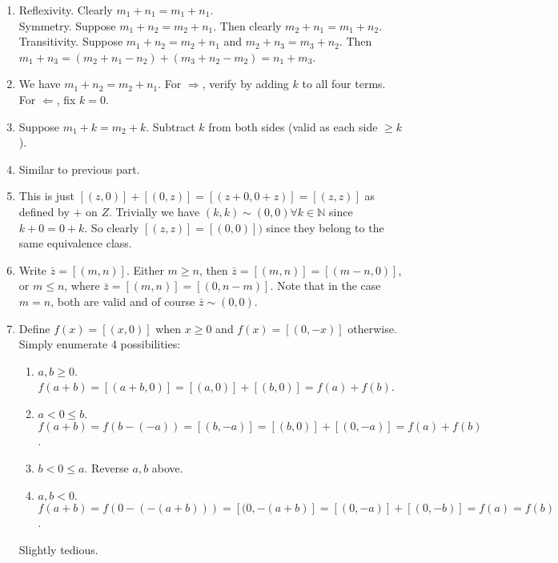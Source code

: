 \documentclass[10pt,a4paper]{article}
\begin{document}
\begin{enumerate}
    \item
    Reflexivity. Clearly \( m_1 + n_1 = m_1 + n_1 \). \\
    Symmetry. Suppose \( m_1 + n_2 = m_2 + n_1 \).
    Then clearly \( m_2 + n_1 = m_1 + n_2 \). \\
    Transitivity. Suppose \( m_1 + n_2 = m_2 + n_1 \) and 
    \( m_2 + n_3 = m_3 + n_2 \). Then
    \( m_1 + n_3 = (m_2 + n_1 - n_2) + (m_3 + n_2 - m_2) = n_1 + m_3 \).
    \item We have \( m_1 + n_2 = m_2 + n_1 \).
    For \( \Rightarrow \), verify by adding \(k\) to all four terms.
    For \( \Leftarrow \), fix \( k = 0 \).
    \item Suppose \( m_1 + k = m_2 + k \). Subtract \(k\) from both sides 
    (valid as each side \( \ge k \)).
    \item Similar to previous part.
    \item This is just \( [(z, 0)] + [(0, z)] = [(z + 0, 0 + z)] = [(z, z)]\) 
    as defined by \( + \) on \( Z \). Trivially we have 
    \( (k, k) \sim (0, 0) \forall k \in \mathbb{N} \) since \( k + 0 = 0 + k\).
    So clearly \( [(z, z)] = [(0, 0)]) \) since they belong to the same 
    equivalence class.
    \item Write \( \bar{z} = [(m, n)] \). Either \( m \ge n \), then 
    \( \bar z = [(m, n)] = [(m - n, 0)] \), or \( m \le n \), where 
    \( \bar z = [(m, n)] = [(0, n - m)] \). Note that in the case \( m = n \), 
    both are valid and of course \( \bar z \sim (0, 0) \).
    \item Define \(f(x) = [(x, 0)] \) when \(x \ge 0 \) and 
    \(f(x) = [(0, -x)] \) otherwise. Simply enumerate 4 possibilities:
    \begin{enumerate}
        \item \( a, b \ge 0 \).
        \( f (a + b) = [(a + b, 0)] = [(a, 0)] + [(b, 0)] = f(a) + f(b) \).
        \item \( a < 0 \le b \).
        \( f (a + b) = f ( b - (-a) ) = [(b, -a)] = [(b, 0)] + [(0, -a)] = f(a) + f(b) \).
        \item \( b < 0 \le a \). Reverse \(a, b\) above.
        \item \( a, b < 0 \).
        \( f (a + b) = f ( 0 - ( - (a + b))) = [(0, -(a + b)] = [(0, -a)] + [(0, -b)] = f(a) = f(b) \).
    \end{enumerate}
    Slightly tedious.
\end{enumerate}
\end{document}
